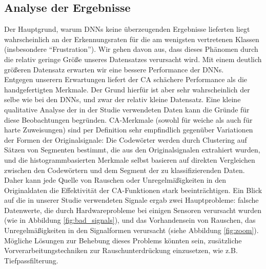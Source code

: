 \subsection{Analyse der Ergebnisse} \label{analyse-subsec}


Der Hauptgrund, warum DNNs keine überzeugenden Ergebnisse lieferten liegt wahrscheinlich an der Erkennungsraten f{\"u}r die am wenigsten vertretenen Klassen (insbesondere ``Frustration'').
Wir gehen davon aus, dass dieses Ph{\"a}nomen durch die relativ geringe Gr{\"o}{\ss}e unseres Datensatzes verursacht wird. 
Mit einem deutlich größeren Datensatz erwarten wir eine bessere Performance der DNNs.\\

Entgegen unserern Erwartungen liefert der CA sch{\"a}chere Performance als die handgefertigten Merkmale. Der Grund hierf{\"u}r ist aber sehr wahrscheinlich der selbe wie bei den  DNNs, und zwar der relativ kleine Datensatz. 
Eine kleine qualitative Analyse der in der Studie verwendeten Daten kann die Gr{\"u}nde f{\"u}r diese Beobachtungen begr{\"u}nden. 
CA-Merkmale (sowohl f{\"u}r weiche als auch f{\"u}r harte Zuweisungen) sind per Definition sehr empfindlich gegen{\"u}ber Variationen der Formen der Originalsignale: Die Codew{\"o}rter werden durch Clustering auf S{\"a}tzen von Segmenten bestimmt, die aus den Originalsignalen extrahiert wurden, und die histogrammbasierten Merkmale selbst basieren auf direkten Vergleichen zwischen den Codew{\"o}rtern und dem Segment der zu klassifizierenden Daten. 
Daher kann jede Quelle von Rauschen oder Unregelm{\"a}{\ss}igkeiten in den Originaldaten die Effektivit{\"a}t der CA-Funktionen stark beeintr{\"a}chtigen. 
Ein Blick auf die in unserer Studie verwendeten Signale ergab zwei Hauptprobleme: falsche Datenwerte, die durch Hardwareprobleme bei einigen Sensoren verursacht wurden (wie in Abbildung \ref{fig:bad_signals}), und das Vorhandensein von Rauschen, das Unregelm{\"a}{\ss}igkeiten in den Signalformen verursacht (siehe Abbildung \ref{fig:zoom}). M{\"o}gliche L{\"o}sungen zur Behebung dieses Problems k{\"o}nnten sein, zus{\"a}tzliche Vorverarbeitungstechniken zur Rauschunterdr{\"u}ckung einzusetzen, wie z.B. Tiefpassfilterung. \\


